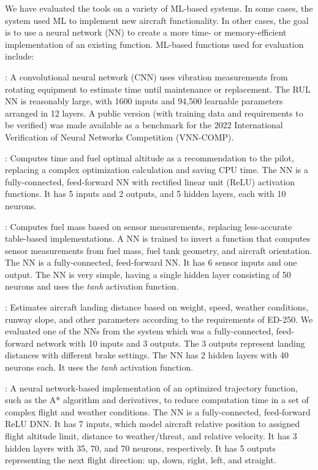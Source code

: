We have evaluated the tools on a variety of ML-based systems.  In some cases, the system used ML to implement new aircraft functionality.  In other cases, the goal is to use a neural network (NN) to create a more time- or memory-efficient implementation of an existing function.  ML-based functions used for evaluation include:

:  A convolutional neural network (CNN) uses vibration measurements from rotating equipment to estimate time until maintenance or replacement.  The RUL NN is reasonably large, with 1600 inputs and 94,500 learnable parameters arranged in 12 layers. A public version (with training data and requirements to be verified) was made available as a benchmark for the 2022 International Verification of Neural Networks Competition (VNN-COMP).


:  Computes time and fuel optimal altitude as a recommendation to the pilot, replacing a complex optimization calculation and saving CPU time. The NN is a fully-connected, feed-forward NN with rectified linear unit (ReLU) activation functions. It has 5 inputs and 2 outputs, and 5 hidden layers, each with 10 neurons.


:  Computes fuel mass based on sensor measurements, replacing less-accurate table-based implementations.  A NN is trained to invert a function that computes sensor measurements from fuel mass, fuel tank geometry, and aircraft orientation.  The NN is a fully-connected, feed-forward NN. It has 6 sensor inputs and one output. The NN is very simple, having a single hidden layer consisting of 50 neurons and uses the \emph{tanh} activation function. 


:  Estimates aircraft landing distance based on weight, speed, weather conditions, runway slope, and other parameters according to the requirements of ED-250.  We evaluated one of the NNs from the system which was a fully-connected, feed-forward network with 10 inputs and 3 outputs. The 3 outputs represent landing distances with different brake settings. The NN has 2 hidden layers with 40 neurons each. It uses the \emph{tanh} activation function. 

: A neural network-based implementation of an optimized trajectory function, such as the A* algorithm and derivatives, to reduce computation time in a set of complex flight and weather conditions. The NN is a fully-connected, feed-forward ReLU DNN. It has 7 inputs, which model aircraft relative position to assigned flight altitude limit, distance to weather/threat, and relative velocity. It has 3 hidden layers with 35, 70, and 70 neurons, respectively. It has 5 outputs representing the next flight direction: up, down, right, left, and straight.


